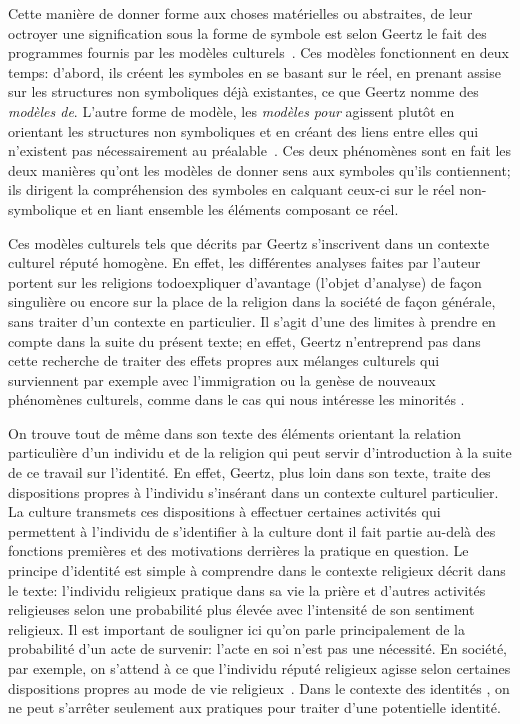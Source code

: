 Cette manière de donner forme aux choses matérielles ou abstraites, de leur octroyer une signification sous la forme de symbole est selon Geertz le fait des programmes fournis par les modèles culturels~\citep[25]{Geertz1972}. 
Ces modèles fonctionnent en deux temps: d'abord, ils créent les symboles en se basant sur le réel, en prenant assise sur les structures non symboliques déjà existantes, ce que Geertz nomme des \emph{modèles de}. 
L'autre forme de modèle, les \emph{modèles pour} agissent plutôt en orientant les structures non symboliques et en créant des liens entre elles qui n'existent pas nécessairement au préalable~\citep[26--27]{Geertz1972}. 
Ces deux phénomènes sont en fait les deux manières qu'ont les modèles de donner sens aux symboles qu'ils contiennent; ils dirigent la compréhension des symboles en calquant ceux-ci sur le réel non-symbolique et en liant ensemble les éléments composant ce réel.

Ces modèles culturels  tels que décrits par Geertz s'inscrivent dans un contexte culturel réputé homogène. 
En effet, les différentes analyses faites par l'auteur portent sur les religions todo{expliquer d'avantage} (l'objet d'analyse) de façon singulière ou encore sur la place de la religion dans la société de façon générale, sans traiter d'un contexte en particulier. 
Il s'agit d'une des limites à prendre en compte dans la suite du présent texte; en effet, Geertz n'entreprend pas dans cette recherche de traiter des effets propres aux mélanges culturels qui surviennent par exemple avec l'immigration ou la genèse de nouveaux phénomènes culturels, comme dans le cas qui nous intéresse les minorités \lgbt{}.

On trouve tout de même dans son texte des éléments orientant la relation particulière d'un individu et de la religion qui peut servir d'introduction à la suite de ce travail sur l'identité. 
En effet, Geertz, plus loin dans son texte, traite des dispositions propres à l'individu s'insérant dans un contexte culturel particulier. 
La culture transmets ces dispositions à effectuer certaines activités qui permettent à l'individu de s'identifier à la culture dont il fait partie au-delà des fonctions premières et des motivations derrières la pratique en question. 
Le principe d'identité est simple à comprendre dans le contexte religieux décrit dans le texte: l'individu religieux pratique dans sa vie la prière et d'autres activités religieuses selon une probabilité plus élevée avec l'intensité de son sentiment religieux. 
Il est important de souligner ici qu'on parle principalement de la probabilité d'un acte de survenir: l'acte en soi n'est pas une nécessité. 
En société, par exemple, on s'attend à ce que l'individu réputé religieux agisse selon certaines dispositions propres au mode de vie religieux~\citep[28--30]{Geertz1972}. 
Dans le contexte des identités \lgbt{}, on ne peut s'arrêter seulement aux pratiques pour traiter d'une potentielle identité.

